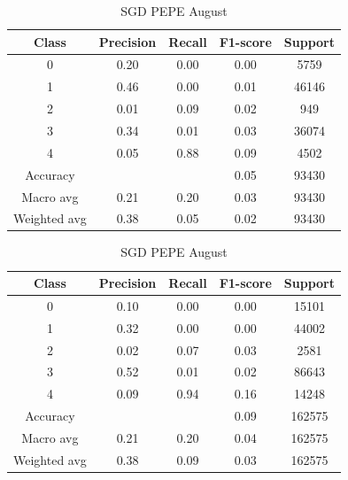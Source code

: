 \begin{enumerate}
        \begin{table}[H]
        \centering
        \scriptsize
        \begin{minipage}{0.48\textwidth}
        \centering
        \begin{tabular}{c|cccc}
        \hline
        Class & Precision & Recall & F1-score & Support \\
        \hline
        0 & 0.20 & 0.00 & 0.00 & 5759 \\
        1 & 0.46 & 0.00 & 0.01 & 46146 \\
        2 & 0.01 & 0.09 & 0.02 & 949 \\
        3 & 0.34 & 0.01 & 0.03 & 36074 \\
        4 & 0.05 & 0.88 & 0.09 & 4502 \\
        \hline
        Accuracy &       &      & 0.05 & 93430 \\
        Macro avg & 0.21 & 0.20 & 0.03 & 93430 \\
        Weighted avg & 0.38 & 0.05 & 0.02 & 93430 \\
        \hline
        \end{tabular}
        \caption{SGD DOGE August}
        \label{tab:classifier_1_report_sgd_doge_non_filtered_aug}
        \end{minipage}
        \hfill
        \begin{minipage}{0.48\textwidth}
        \centering
        \begin{tabular}{c|cccc}
        \hline
        Class & Precision & Recall & F1-score & Support \\
        \hline
        0 & 0.10 & 0.00 & 0.00 & 15101 \\
        1 & 0.32 & 0.00 & 0.00 & 44002 \\
        2 & 0.02 & 0.07 & 0.03 & 2581 \\
        3 & 0.52 & 0.01 & 0.02 & 86643 \\
        4 & 0.09 & 0.94 & 0.16 & 14248 \\
        \hline
        Accuracy &       &      & 0.09 & 162575 \\
        Macro avg & 0.21 & 0.20 & 0.04 & 162575 \\
        Weighted avg & 0.38 & 0.09 & 0.03 & 162575 \\
        \hline
        \end{tabular}
        \caption{SGD PEPE August}
        \label{tab:classifier_1_report_sgd_pepe_non_filtered_aug}
        \end{minipage}
        

\end{table}
\end{enumerate}
